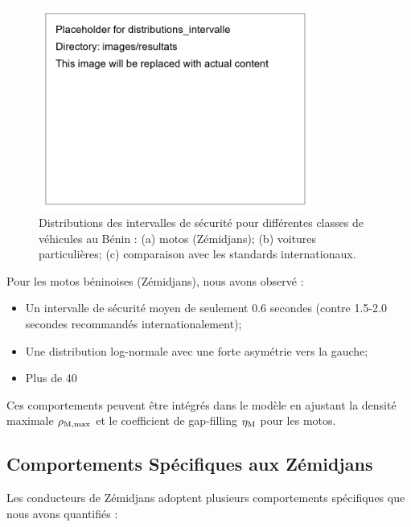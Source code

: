 \begin{figure}[htbp]
\centering
\includegraphics[width=0.8\textwidth]{images/resultats/distributions_intervalle}
\caption{Distributions des intervalles de sécurité pour différentes classes de véhicules au Bénin : (a) motos (Zémidjans); (b) voitures particulières; (c) comparaison avec les standards internationaux.}
\label{fig:distributions_intervalle}
\end{figure}

Pour les motos béninoises (Zémidjans), nous avons observé :
\begin{itemize}
\item Un intervalle de sécurité moyen de seulement 0.6 secondes (contre 1.5-2.0 secondes recommandés internationalement);
\item Une distribution log-normale avec une forte asymétrie vers la gauche;
\item Plus de 40%
\end{itemize}

Ces comportements peuvent être intégrés dans le modèle en ajustant la densité maximale $\rho_{\text{M,max}}$ et le coefficient de gap-filling $\eta_{\text{M}}$ pour les motos.

\subsection{Comportements Spécifiques aux Zémidjans}
\label{subsec:comportements_zemidjans}

Les conducteurs de Zémidjans adoptent plusieurs comportements spécifiques que nous avons quantifiés :

